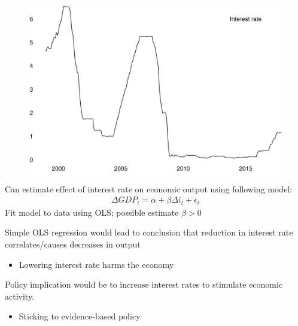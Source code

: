 \documentclass{beamer}
\begin{document}
\begin{frame}
  \begin{figure}
    \includegraphics[scale=.3]{effective_rate.eps}
  \end{figure}
\end{frame}

\begin{frame}
 Can estimate effect of interest rate on economic output using following model: 
  \begin{align*}
    \Delta GDP_t = \alpha + \beta \Delta i_t + \epsilon_t
  \end{align*}
  \medskip
  Fit model to data using OLS; possible estimate $\beta > 0$
\end{frame}


\begin{frame}
  Simple OLS regression would lead to conclusion that reduction in interest rate correlates/causes decreases in output
  \begin{itemize}
    \item Lowering interest rate harms the economy
  \end{itemize}
  \medskip
  Policy implication would be to increase interest rates to stimulate economic activity.
  \begin{itemize}
    \item Sticking to evidence-based policy
  \end{itemize}
\end{frame}
\end{document}
